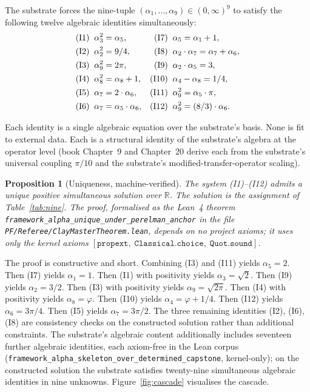 \documentclass[11pt,a4paper]{amsart}
\theoremstyle{plain}
\newtheorem{proposition}[theorem]{Proposition}
\theoremstyle{definition}
\begin{document}
The substrate forces the nine-tuple $(\alpha_1, \ldots, \alpha_9) \in (0,\infty)^9$ to satisfy the following twelve algebraic identities simultaneously:
\begin{align*}
\textup{(I1)}\;\;& \alpha_3^2 = \alpha_5, &
\textup{(I7)}\;\;& \alpha_5 = \alpha_1 + 1,\\
\textup{(I2)}\;\;& \alpha_2^2 = 9/4, &
\textup{(I8)}\;\;& \alpha_2\cdot\alpha_7 = \alpha_7 + \alpha_6,\\
\textup{(I3)}\;\;& \alpha_9^2 = 2\pi, &
\textup{(I9)}\;\;& \alpha_2\cdot\alpha_5 = 3,\\
\textup{(I4)}\;\;& \alpha_8^2 = \alpha_8 + 1, &
\textup{(I10)}\;\;& \alpha_4 - \alpha_8 = 1/4,\\
\textup{(I5)}\;\;& \alpha_7 = 2\cdot\alpha_6, &
\textup{(I11)}\;\;& \alpha_9^2 = \alpha_5\cdot\pi,\\
\textup{(I6)}\;\;& \alpha_7 = \alpha_5\cdot\alpha_6, &
\textup{(I12)}\;\;& \alpha_9^2 = (8/3)\cdot\alpha_6.
\end{align*}

Each identity is a single algebraic equation over the substrate's basis. None is fit to external data. Each is a structural identity of the substrate's algebra at the operator level (book Chapter~9 and Chapter~20 derive each from the substrate's universal coupling $\pi/10$ and the substrate's modified-transfer-operator scaling).

\begin{proposition}[Uniqueness, machine-verified]\label{prop:unique}
The system \textup{(I1)--(I12)} admits a unique positive simultaneous solution over $\mathbb{R}$. The solution is the assignment of Table~\ref{tab:nine}. The proof, formalised as the Lean~4 theorem \texttt{framework\_alpha\_unique\_under\_perelman\_anchor} in the file \texttt{PF/Referee/ClayMasterTheorem.lean}, depends on no project axioms; it uses only the kernel axioms $[\texttt{propext},\;\texttt{Classical.choice},\;\texttt{Quot.sound}]$.
\end{proposition}

The proof is constructive and short. Combining (I3) and (I11) yields $\alpha_5 = 2$. Then (I7) yields $\alpha_1 = 1$. Then (I1) with positivity yields $\alpha_3 = \sqrt{2}$. Then (I9) yields $\alpha_2 = 3/2$. Then (I3) with positivity yields $\alpha_9 = \sqrt{2\pi}$. Then (I4) with positivity yields $\alpha_8 = \varphi$. Then (I10) yields $\alpha_4 = \varphi + 1/4$. Then (I12) yields $\alpha_6 = 3\pi/4$. Then (I5) yields $\alpha_7 = 3\pi/2$. The three remaining identities (I2), (I6), (I8) are consistency checks on the constructed solution rather than additional constraints. The substrate's algebraic content additionally includes seventeen further algebraic identities, each axiom-free in the Lean corpus (\texttt{framework\_alpha\_skeleton\_over\_determined\_capstone}, kernel-only); on the constructed solution the substrate satisfies twenty-nine simultaneous algebraic identities in nine unknowns. Figure~\ref{fig:cascade} visualises the cascade.
\end{document}
